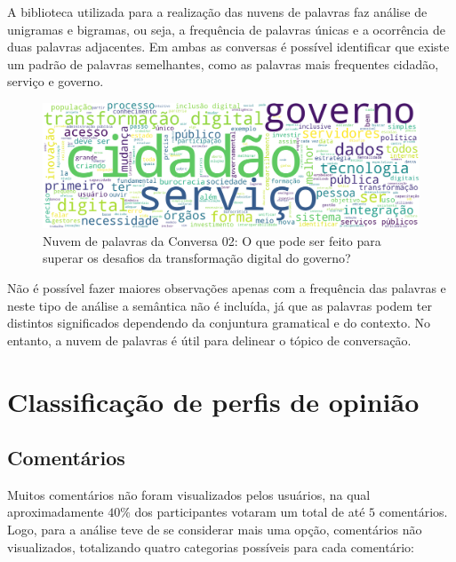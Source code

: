 A biblioteca utilizada para a realização das nuvens de palavras faz análise de unigramas e bigramas, ou seja, a frequência de palavras únicas e a ocorrência de duas palavras adjacentes. Em ambas as conversas é possível identificar que existe um padrão de palavras semelhantes, como as palavras mais frequentes cidadão, serviço e governo. 


\begin{figure}[!h]
	\centering
	\includegraphics[keepaspectratio=true,scale=0.18]{figuras/tcc2/nuvem/nuvem_palavras_conversa_2.png}
	\caption{Nuvem de palavras da Conversa 02: O que pode ser feito para superar os desafios da  transformação digital do governo?}
	\label{fig:nuvem-palavras-conversa-2}
\end{figure}

Não é possível fazer maiores observações apenas com a frequência das palavras e neste tipo de análise a semântica não é incluída, já que as palavras podem ter distintos significados dependendo da conjuntura gramatical e do contexto. No entanto, a nuvem de palavras é útil para delinear o tópico de conversação.


\section{Classificação de perfis de opinião}

\subsection{Comentários}

Muitos comentários não foram visualizados pelos usuários, na qual aproximadamente $40\%$ dos participantes votaram um total de até $5$ comentários.  Logo, para a análise teve de se considerar mais uma opção, comentários não visualizados, totalizando quatro categorias possíveis para cada comentário:

